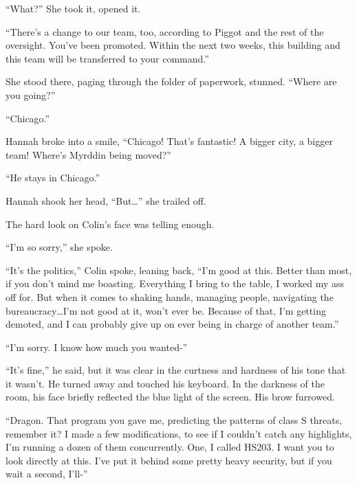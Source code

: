 ``What?''  She took it, opened it.



``There's a change to our team, too, according to Piggot and the rest of the oversight.  You've been promoted.  Within the next two weeks, this building and this team will be transferred to your command.''



She stood there, paging through the folder of paperwork, stunned.  ``Where are you going?''



``Chicago.''



Hannah broke into a smile, ``Chicago!  That's fantastic!  A bigger city, a bigger team!  Where's Myrddin being moved?''



``He stays in Chicago.''



Hannah shook her head, ``But\ldots'' she trailed off.



The hard look on Colin's face was telling enough.



``I'm so sorry,'' she spoke.



``It's the politics,'' Colin spoke, leaning back, ``I'm good at this.  Better than most, if you don't mind me boasting.  Everything I bring to the table, I worked my ass off for.  But when it comes to shaking hands, managing people, navigating the bureaucracy\ldots I'm not good at it, won't ever be.  Because of that, I'm getting demoted, and I can probably give up on ever being in charge of another team.''



``I'm sorry.  I know how much you wanted-''



``It's fine,'' he said, but it was clear in the curtness and hardness of his tone that it wasn't.  He turned away and touched his keyboard.  In the darkness of the room, his face briefly reflected the blue light of the screen.  His brow furrowed.



``Dragon.  That program you gave me, predicting the patterns of class S threats, remember it?  I made a few modifications, to see if I couldn't catch any highlights, I'm running a dozen of them concurrently.  One, I called HS203.  I want you to look directly at this.  I've put it behind some pretty heavy security, but if you wait a second, I'll-''



